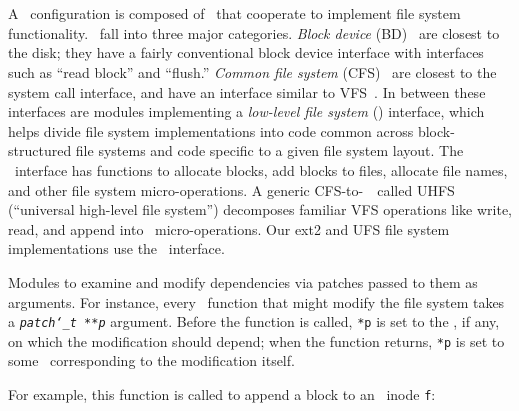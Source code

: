 
\section{\Modules}
\label{sec:modules}

A \Kudos\ configuration is composed of \modules\ that cooperate to
 implement file system functionality.
%
\Modules\ fall into three major categories.
%
\emph{Block device} (BD) \modules\ are closest to the disk; they have a fairly
conventional block device interface with interfaces such as ``read block'' and
``flush.''
%
\emph{Common file system} (CFS) \modules\ are closest to the system call
interface, and have an interface similar to VFS~\cite{kleiman86vnodes}. 
%
In between these interfaces are modules implementing a  \emph{low-level file
system} (\LFS) interface, which helps divide file system implementations
into code common across block-structured file systems and code specific to
a given file system layout.
%
The \LFS\ interface has functions to allocate blocks, add blocks to files,
allocate file names, and other file system micro-operations. 
A generic CFS-to-\LFS\ \module\ called UHFS
(``universal high-level file system'') decomposes familiar VFS operations
like write, read, and append into \LFS\ micro-operations. 
%
%
Our ext2 and UFS file system implementations
use the \LFS\ interface.


Modules to examine and modify dependencies via patches passed to them as
arguments.
%
For instance, every \LFS\ function that might modify the file system takes a
\texttt{\textit{patch\char`\_t **p}} argument.
%
Before the function is called, \texttt{*p} is set to the \patch,
if any, on which the modification should depend;
%
when the function returns, \texttt{*p} is set to some \patch\
corresponding to the modification itself.
%
\begin{comment}
(\Noop\ \patches\ allow this interface to generalize to multiple
dependencies.)
\end{comment}
%
For example, this function is called to append a block to an \LFS\ inode
\verb+f+:

